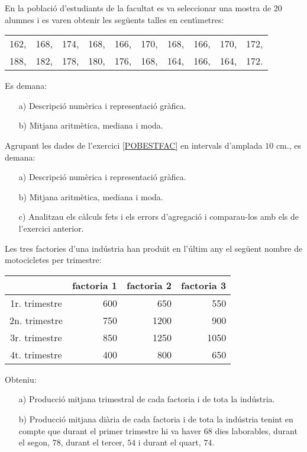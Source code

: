 \begin{prob}
{
En la poblaci\'o 
d'estudiants de la facultat es va seleccionar una mostra
de 20 alumnes i es varen obtenir les seg\"uents talles en cent\'{\i}metres:
\begin{center}
\begin{tabular}{cccccccccc}
162,&168,&174,&168,&166,&170,&168,&166,&170,&172,\\
188,&182,&178,&180,&176,&168,&164,&166,&164,&172.\\
\end{tabular}
\end{center}
Es demana:
\begin{itemize}
\item[a)] {Descripci\'o num\`erica i representaci\'o gr\`afica.
}
\item[b)] {Mitjana aritm\`etica, 
mediana i moda.}
\end{itemize}
}
\end{prob}

\begin{prob}
{
Agrupant les dades de l'exercici \ref{POBESTFAC} en intervals d'amplada 
$10$ cm., es demana:
\begin{itemize}
\item[a)] {Descripci\'o num\`erica i representaci\'o gr\`afica.
}
\item[b)] {Mitjana aritm\`etica, 
mediana i moda.}
\item[c)] {Analitzau els c\`alculs fets i els errors d'agregaci\'o 
i comparau-los
amb els de l'exercici anterior.}
\end{itemize}}
\end{prob}

\begin{prob}
{
Les tres factories d'una ind\'ustria
 han produ\"{\i}t en l'\'ultim any el seg\"uent
nombre de motocicletes per trimestre:
\begin{center}
\begin{tabular}{|c||r|r|r|}
\hline
 & factoria 1 & factoria 2 & 
factoria 3 \\\hline\hline 
1r. trimestre & 600 & 650 & 550 \\\hline 
2n. trimestre & 750 & 1200 & 900 \\\hline
3r. trimestre & 850 &1250 & 1050 \\\hline
4t. trimestre & 400 & 800 & 650 \\\hline
\end{tabular}
\end{center}
Obteniu:
\begin{itemize}
\item[a)] {Producci\'o mitjana 
trimestral de cada factoria i de tota la
ind\'ustria.}
\item[b)] {Producci\'o mitjana 
di\`aria de cada factoria i 
de tota la ind\'ustria
tenint en compte que durant el primer trimestre hi va 
haver $68$ dies laborables, durant el segon, $78$, durant el tercer, $54$ i 
durant el quart, $74$.}
\end{itemize}
}
\end{prob}

